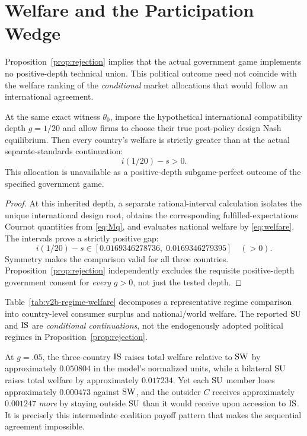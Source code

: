 \section{Welfare and the Participation Wedge}\label{sec:welfare}

Proposition~\ref{prop:rejection} implies that the actual
government game implements no positive-depth technical union.
This political outcome need not coincide with the welfare
ranking of the \emph{conditional} market allocations that
would follow an international agreement.

\begin{proposition}
\label{prop:pareto}
At the same exact witness $\theta_0$, impose the
hypothetical international compatibility depth
$g=1/20$ and allow firms to choose their true
post-policy design Nash equilibrium. Then every
country's welfare is strictly greater than at the
actual separate-standards continuation:
\begin{equation}\label{eq:pareto}
 i(1/20)-s >0.
\end{equation}
This allocation is unavailable as a positive-depth
subgame-perfect outcome of the specified government game.
\end{proposition}

\begin{proof}
At this inherited depth, a separate rational-interval
calculation isolates the unique international design
root, obtains the corresponding fulfilled-expectations
Cournot quantities from \eqref{eq:Mq}, and evaluates
national welfare by \eqref{eq:welfare}. The intervals
prove a strictly positive gap:
\[
 i(1/20)-s \in
 [0.0169346278736,\;0.0169346279395]\quad (>0).
\]
Symmetry makes the comparison valid for all three countries.
Proposition~\ref{prop:rejection} independently excludes
the requisite positive-depth government consent for
\emph{every} $g>0$, not just the tested depth.
\end{proof}

Table~\ref{tab:v2b-regime-welfare} decomposes a
representative regime comparison into country-level
consumer surplus and national/world welfare.
The reported $\mathrm{SU}$ and $\mathrm{IS}$ are \emph{conditional
continuations}, not the endogenously adopted political
regimes in Proposition~\ref{prop:rejection}.


At $g=.05$, the three-country $\mathrm{IS}$ raises total
welfare relative to $\mathrm{SW}$ by approximately $0.050804$
in the model's normalized units, while a bilateral
$\mathrm{SU}$ raises total welfare by approximately $0.017234$.
Yet each $\mathrm{SU}$ member loses approximately $0.000473$
against $\mathrm{SW}$, and the outsider $C$ receives
approximately $0.001247$ \emph{more} by staying outside
$\mathrm{SU}$ than it would receive upon accession to $\mathrm{IS}$.
It is precisely this intermediate coalition payoff
pattern that makes the sequential agreement impossible.

